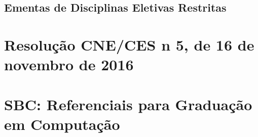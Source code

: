\section{Ementas de Disciplinas Eletivas Restritas}
\pagebreak











\chapter{Resolução CNE/CES n\textordmasculine{} 5, de 16 de novembro de 2016}
\label{cne2016}

\chapter{SBC: Referenciais para Graduação em Computação}
\label{sbc2017}

